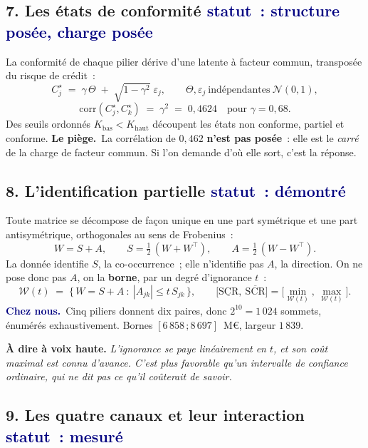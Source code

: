 \documentclass[11pt,a4paper]{article}
\newcommand{\cheznous}[1]{\smallskip\noindent\textcolor{navy}{\textbf{Chez nous.}}\ #1\par}
\newcommand{\lepiege}[1]{\smallskip\noindent\textcolor{accent}{\textbf{Le piège.}}\ #1\par}
\newcommand{\laphrase}[1]{\begin{phrasebox}\textbf{À dire à voix haute.} \emph{#1}\end{phrasebox}}
\begin{document}
\subsection*{7. Les états de conformité \quad\small\textcolor{navy}{statut~: structure posée, charge posée}\normalsize}

La conformité de chaque pilier dérive d'une latente à facteur commun, transposée du risque de
crédit~:
\[
C^\star_j \;=\; \gamma\,\Theta \;+\; \sqrt{1-\gamma^{2}}\;\varepsilon_j,
\qquad \Theta,\varepsilon_j \ \text{indépendantes} \ \mathcal{N}(0,1),
\]
\[
\mathrm{corr}(C^\star_j, C^\star_k) \;=\; \gamma^{2} \;=\; 0{,}4624
\quad\text{pour } \gamma=0{,}68 .
\]
\noindent Des seuils ordonnés $K_{\text{bas}}<K_{\text{haut}}$ découpent les états non conforme,
partiel et conforme.
\lepiege{La corrélation de $0{,}462$ \textbf{n'est pas posée}~: elle est le \emph{carré} de la
charge de facteur commun. Si l'on demande d'où elle sort, c'est la réponse.}

\subsection*{8. L'identification partielle \quad\small\textcolor{navy}{statut~: démontré}\normalsize}

Toute matrice se décompose de façon unique en une part symétrique et une part antisymétrique,
orthogonales au sens de Frobenius~:
\[
W = S + A, \qquad S=\tfrac12\,(W+W^{\!\top}), \qquad A=\tfrac12\,(W-W^{\!\top}).
\]
\noindent La donnée identifie $S$, la co-occurrence~; elle n'identifie pas $A$, la direction. On
ne pose donc pas $A$, on la \textbf{borne}, par un degré d'ignorance $t$~:
\[
\mathcal{W}(t) \;=\; \bigl\{\,W=S+A \ :\ |A_{jk}| \le t\,S_{jk}\,\bigr\},
\qquad
\bigl[\underline{\mathrm{SCR}},\ \overline{\mathrm{SCR}}\bigr]
= \bigl[\min_{\mathcal{W}(t)}, \ \max_{\mathcal{W}(t)}\bigr].
\]
\cheznous{Cinq piliers donnent dix paires, donc $2^{10}=1\,024$ sommets, énumérés
exhaustivement. Bornes $[6\,858\,;8\,697]$~M\euro, largeur $1\,839$.}
\laphrase{L'ignorance se paye linéairement en $t$, et son coût maximal est connu d'avance. C'est
plus favorable qu'un intervalle de confiance ordinaire, qui ne dit pas ce qu'il coûterait de
savoir.}

\subsection*{9. Les quatre canaux et leur interaction \quad\small\textcolor{navy}{statut~: mesuré}\normalsize}
\end{document}
